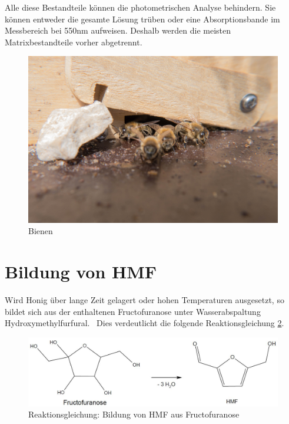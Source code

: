 Alle diese Bestandteile können die photometrischen Analyse behindern. Sie können entweder die gesamte Lösung trüben oder eine Absorptionsbande im Messbereich bei 550nm aufweisen. Deshalb werden die meisten Matrixbestandteile vorher abgetrennt.~\cite{LWG}
\begin{figure}[htbp]
    \centering
        \includegraphics[width=1.00\textwidth]{../Bilder/P1050729.jpg}
    \caption{Bienen \cite{Bienen}}
    \label{fig:Bienen}
\end{figure}


\section{Bildung von HMF}

Wird Honig über lange Zeit gelagert oder hohen Temperaturen ausgesetzt, so bildet sich aus der enthaltenen Fructofuranose unter Wasserabspaltung Hydroxymethylfurfural.~\cite{HMF} Dies verdeutlicht die folgende Reaktionsgleichung \ref{fig:HMFEntstehung}. 
  
\begin{figure}[htbp]
    \centering
        \includegraphics[width=1.00\textwidth]{../Bilder/HMFEntstehung.JPG}
    \caption{Reaktionsgleichung: Bildung von HMF aus Fructofuranose}
    \label{fig:HMFEntstehung}
\end{figure}

